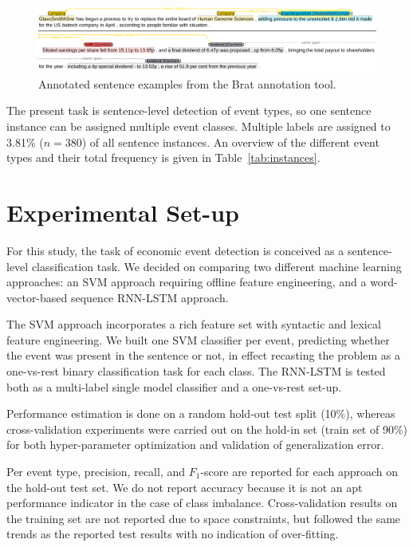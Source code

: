 \documentclass[11pt,a4paper]{article}
\begin{document}
\begin{figure}[!htb]
    \centering
    \includegraphics[width=\textwidth]{figures/annexamples600dpi.png}
    \caption{Annotated sentence examples from the Brat annotation tool.}
    \label{fig:bratexamples}
\end{figure}

The present task is sentence-level detection of event types, so one sentence instance can be assigned multiple event classes.
Multiple labels are assigned to 3.81\% ($n=380$) of all sentence instances.
An overview of the different event types and their total frequency is given in Table~\ref{tab:instances}.

\section{Experimental Set-up} \label{experimentalsetup}

For this study, the task of economic event detection is conceived as a sentence-level classification task.
We decided on comparing two different machine learning approaches: an SVM approach requiring offline feature engineering, and a word-vector-based sequence RNN-LSTM approach.

The SVM approach incorporates a rich feature set with syntactic and lexical feature engineering.
We built one SVM classifier per event, predicting whether the event was present in the sentence or not, in effect recasting the problem as a one-vs-rest binary classification task for each class.
The RNN-LSTM is tested both as a multi-label single model classifier and a one-vs-rest set-up.

Performance estimation is done on a random hold-out test split (10\%), whereas cross-validation experiments were carried out on the hold-in set (train set of 90\%) for both hyper-parameter optimization and validation of generalization error.

Per event type, precision, recall, and $F_1$-score are reported for each approach on the hold-out test set.
We do not report accuracy because it is not an apt performance indicator in the case of class imbalance.
Cross-validation results on the training set are not reported due to space constraints, but followed the same trends as the reported test results with no indication of over-fitting.
\end{document}
